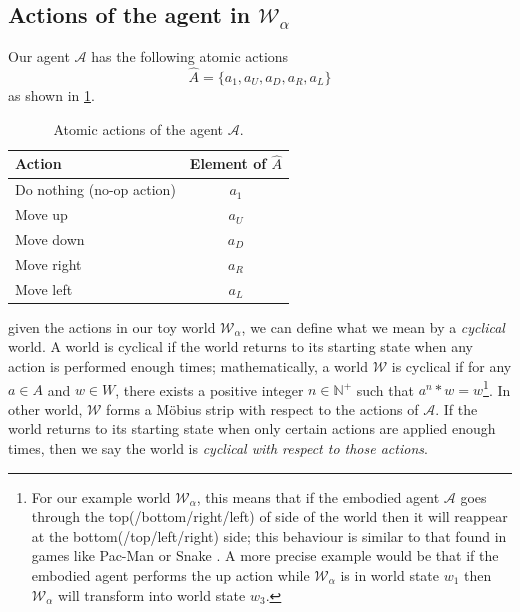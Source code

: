 \subsection{
Actions of the agent in $\mathscr{W}_{\alpha}$
}\label{sec:Actions of the agent in example}

Our agent $\mathscr{A}$ has the following atomic actions
\begin{equation}
    \hat{A} = \{ a_{1}, a_{U}, a_{D}, a_{R}, a_{L} \}
\end{equation}
as shown in \cref{tab:actions_of_agent_2_by_2_cyclical}.
\begin{table}[H]
    \centering
    \begin{tabular}{l|c}
        \hline
        Action                    & Element of $\hat{A}$ \\
        \hline
        Do nothing (no-op action) & $a_{1}$ \\
        Move up                   & $a_{U}$ \\
        Move down                 & $a_{D}$ \\
        Move right                & $a_{R}$ \\
        Move left                 & $a_{L}$
    \end{tabular}
    \caption{
    Atomic actions of the agent $\mathscr{A}$.
    }
    \label{tab:actions_of_agent_2_by_2_cyclical}
\end{table}

 given the actions in our toy world $\mathscr{W}_{\alpha}$, we can define what we mean by a \emph{cyclical} world.
A world is cyclical if the world returns to its starting state when any action is performed enough times; mathematically, a world $\mathscr{W}$ is cyclical if for any $a \in A$ and $w \in W$, there exists a positive integer $n \in \mathbb{N}^{+}$ such that $a^{n} \ast w = w$\footnote{
    For our example world $\mathscr{W}_{\alpha}$, this means that if the embodied agent $\mathscr{A}$ goes through the top(/bottom/right/left) of side of the world then it will reappear at the bottom(/top/left/right) side; this behaviour is similar to that found in games like Pac-Man  or Snake .
    A more precise example would be that if the embodied agent performs the up action while $\mathscr{W}_{\alpha}$ is in world state $w_{1}$ then $\mathscr{W}_{\alpha}$ will transform into world state $w_{3}$.
}.
In other world, $\mathscr{W}$ forms a Möbius strip with respect to the actions of $\mathscr{A}$.
If the world returns to its starting state when only certain actions are applied enough times, then we say the world is \emph{cyclical with respect to those actions}.

